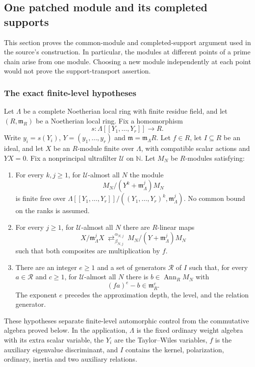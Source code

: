 \subsection{One patched module and its completed supports}
\label{sec:sr-common-patched-module}
This section proves the common-module and completed-support argument
used in the source's  construction. In particular, the
modules at different points of a prime chain arise from one module.
Choosing a new module independently at each point would not prove
the support-transport assertion.

\subsubsection{The exact finite-level hypotheses}
Let $\Lambda$ be a complete Noetherian local ring with finite residue
field, and let $(R,\mathfrak m_R)$ be a Noetherian local ring.
Fix a homomorphism
\[
       s:\Lambda[[Y_1,\ldots,Y_r]]\longrightarrow R.
\]
Write $y_i=s(Y_i)$, $Y=(y_1,\ldots,y_r)$ and
$\mathfrak m=\mathfrak m_\Lambda R$.
Let $f\in R$, let $I\subseteq R$ be an ideal, and let $X$ be an
$R$-module finite over $\Lambda$, with compatible scalar actions and
$YX=0$. Fix a nonprincipal ultrafilter $\mathcal U$ on $\mathbb N$.
Let $M_N$ be $R$-modules satisfying:
\begin{enumerate}
\item For every $k,j\ge1$, for $\mathcal U$-almost all $N$ the module
\[
                  M_N/(Y^k+\mathfrak m_\Lambda^j)M_N
\]
is finite free over
$\Lambda[[Y_1,\ldots,Y_r]]/((Y_1,\ldots,Y_r)^k,\mathfrak m_\Lambda^j)$.
No common bound on the ranks is assumed.
\item For every $j\ge1$, for $\mathcal U$-almost all $N$ there are
$R$-linear maps
\[
 X/\mathfrak m_\Lambda^jX
       \ \mathop{\rightleftarrows}^{\alpha_{N,j}}_{\beta_{N,j}}\
             M_N/(Y+\mathfrak m_\Lambda^j)M_N
\]
such that both composites are multiplication by $f$.
\item There are an integer $e\ge1$ and a set of generators
$\mathcal R$ of $I$ such that, for every $a\in\mathcal R$ and $c\ge1$,
for $\mathcal U$-almost all $N$ there is $b\in\operatorname{Ann}_R M_N$
with
\[
                            (fa)^e-b\in\mathfrak m_R^c.
\]
The exponent $e$ precedes the approximation depth, the level, and
the relation generator.
\end{enumerate}
These hypotheses separate finite-level automorphic control from
the commutative algebra proved below. In the application,
$\Lambda$ is the fixed ordinary weight algebra with its extra scalar
variable, the $Y_i$ are the Taylor--Wiles variables, $f$ is the
auxiliary eigenvalue discriminant, and $I$ contains the kernel,
polarization, ordinary, inertia and two auxiliary relations.

